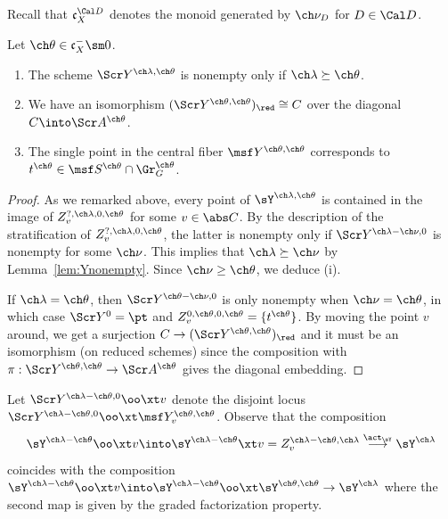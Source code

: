 Recall that $\mathfrak c_X^{\Cal D}$ denotes the monoid
generated by $\ch\nu_D$ for $D\in \Cal D$.
\begin{cor}
\notready \label{cor:Ytheta}
Let $\ch\theta \in \mathfrak c_X^- \sm 0$.
\begin{enumerate}
\item
The scheme $\Scr Y^{\ch\lambda,\ch\theta}$ is nonempty only if
$\ch\lambda \succeq \ch\theta$.

\item
We have an isomorphism $(\Scr Y^{\ch\theta,\ch\theta})_\red \cong C$ over
the diagonal $C \into \Scr A^{\ch\theta}$.

\item
The single point in the central fiber
$\msf Y^{\ch\theta,\ch\theta}$
corresponds to $t^{\ch\theta} \in \msf S^{\ch\theta}\cap \Gr^{\ch\theta}_G$.
\end{enumerate}
\end{cor}
\begin{proof}
As we remarked above, every point of $\sY^{\ch\lambda,\ch\theta}$ is contained
in the image of $Z_v^{?,\ch\lambda,0,\ch\theta}$ for some $v\in \abs C$.
By the description of the stratification
of $Z_v^{?,\ch\lambda,0,\ch\theta}$, the latter is nonempty only
if $\Scr Y^{\ch\lambda-\ch\nu,0}$ is nonempty for some $\ch\nu$.
This implies that $\ch\lambda \succeq \ch\nu$ by
Lemma~\ref{lem:Ynonempty}. Since
$\ch\nu \ge \ch\theta$, we deduce (i).

If $\ch\lambda=\ch\theta$, then $\Scr Y^{\ch\theta-\ch\nu,0}$
is only nonempty when $\ch\nu=\ch\theta$, in which case $\Scr Y^0 = \pt$ and $Z_v^{0,\ch\theta,0,\ch\theta} = \{t^{\ch\theta}\}$.
By moving the point $v$ around, we get
a surjection $C \to (\Scr Y^{\ch\theta,\ch\theta})_\red$ and
it must be an isomorphism (on reduced schemes) since the composition
with $\pi :\Scr Y^{\ch\theta,\ch\theta} \to \Scr A^{\ch\theta}$ gives
the diagonal embedding.
\end{proof}

Let $\Scr Y^{\ch\lambda-\ch\theta,0} \oo\xt v$ denote the disjoint locus
$\Scr Y^{\ch\lambda-\ch\theta,0} \oo\xt \msf Y^{\ch\theta,\ch\theta}_v$.
Observe that the composition
\[ \sY^{\ch\lambda-\ch\theta} \oo\xt v \into
\sY^{\ch\lambda-\ch\theta} \xt v =
Z^{\ch\lambda-\ch\theta,\ch\lambda}_v \overset{\act_\sY}\longrightarrow
\sY^{\ch\lambda} \]
coincides with the composition
$\sY^{\ch\lambda-\ch\theta} \oo\xt v \into
\sY^{\ch\lambda-\ch\theta} \oo\xt \sY^{\ch\theta,\ch\theta} \to
\sY^{\ch\lambda}$
where the second map is given by the graded factorization property.


